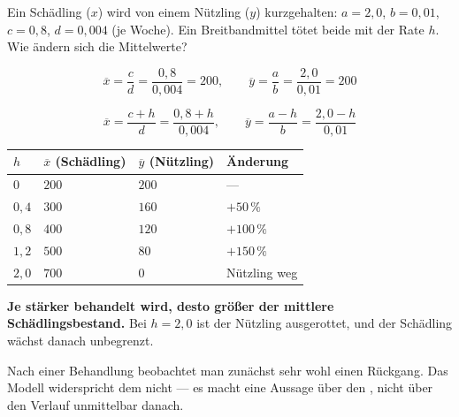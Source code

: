 \begin{aufgabe}
Ein Schädling ($x$) wird von einem Nützling ($y$) kurzgehalten: $a = 2{,}0$, $b = 0{,}01$, $c = 0{,}8$, $d = 0{,}004$ (je Woche). Ein Breitbandmittel tötet beide mit der Rate $h$. Wie ändern sich die Mittelwerte?

\loesung
{}
\[ \overline x = \frac{c}{d} = \frac{0{,}8}{0{,}004} = 200, \qquad \overline y = \frac{a}{b} = \frac{2{,}0}{0{,}01} = 200 \]

\[ \overline x = \frac{c+h}{d} = \frac{0{,}8+h}{0{,}004}, \qquad \overline y = \frac{a-h}{b} = \frac{2{,}0-h}{0{,}01} \]

\begin{center}
{\small
\renewcommand{\arraystretch}{1.48}
\begin{tabular}{@{}P{1.6cm}P{2.2cm}P{2.2cm}P{2.0cm}@{}}
\toprule
$h$ & $\overline x$ (Schädling) & $\overline y$ (Nützling) & \textbf{Änderung}\\
\midrule
$0$ & $200$ & $200$ & ---\\
$0{,}4$ & $300$ & $160$ & $+50\,\%$\\
$0{,}8$ & $400$ & $120$ & $+100\,\%$\\
$1{,}2$ & $500$ & $80$ & $+150\,\%$\\
$2{,}0$ & $700$ & \textcolor{akzent}{$0$} & \textcolor{akzent}{Nützling weg}\\
\bottomrule
\end{tabular}}
\end{center}

\begin{center}
\begin{minipage}{0.9\textwidth}
\textbf{Je stärker behandelt wird, desto größer der mittlere Schädlingsbestand.} Bei $h = 2{,}0$ ist der Nützling ausgerottet, und der Schädling wächst danach unbegrenzt.
\end{minipage}
\end{center}

Nach einer Behandlung beobachtet man zunächst sehr wohl einen Rückgang. Das Modell widerspricht dem nicht --- es macht eine Aussage über den , nicht über den Verlauf unmittelbar danach.

\begin{center}
\begin{minipage}{0.88\textwidth}
\end{minipage}
\end{center}


\end{aufgabe}
